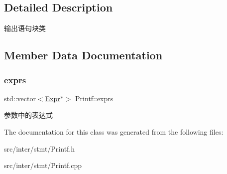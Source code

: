 \subsection{Detailed Description}
输出语句块类 

\subsection{Member Data Documentation}
\mbox{\label{class_printf_ab07a181eb9cd79c9018e172332d44ce5}} 
\subsubsection{\texorpdfstring{exprs}{exprs}}
{\footnotesize\ttfamily std\+::vector$<$\hyperlink{class_expr}{Expr}$\ast$$>$ Printf\+::exprs}

参数中的表达式 

The documentation for this class was generated from the following files\+:\begin{DoxyCompactItemize}
\item 
src/inter/stmt/Printf.\+h\item 
src/inter/stmt/Printf.\+cpp\end{DoxyCompactItemize}

